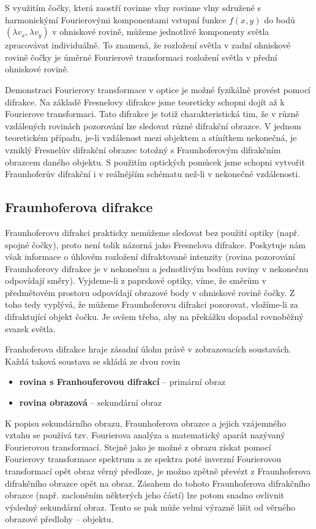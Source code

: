 \documentclass[11pt,a4paper]{article}
\begin{document}
S využitím čočky, která zaostří rovinne vlny rovinne vlny sdružené s harmonickýmí Fourierovými komponentami
vstupní funkce $f(x,y)$ do bodů $(\lambda v_x, \lambda v_y)$ v ohniskové rovině, můžeme jednotlivé
komponenty světla zpracovávat individuálně. To znamená, že rozložení světla v zadní ohniskové 
rovině čočky je úměrné Fourierově transformaci rozložení světla v přední ohniskové rovině.

Demonstraci Fourierovy transformace v optice je možné fyzikálně provést pomocí difrakce. Na základě
Fresnelovy difrakce jsme teoreticky schopni dojít až k Fourierove transformaci. Tato difrakce je totiž
charakteristická tim, že v různě vzdálených rovinách pozorování lze sledovat různé difrakční obrazce. V jednom
teoretickém případu, je-li vzdálenost mezi objektem a stínítkem nekonečná, je vzniklý Fresnelův difrakční 
obrazec totožný s Fraunhoferovým difrakčním obrazcem daného objektu. S použitím optických pomůcek
jsme schopni vytvořit Fraunhoferův difrakční i v reálnějším schématu než-li v nekonečné vzdálenosti.

\subsection{Fraunhoferova difrakce}
Fraunhoferovu difrakci prakticky nemůžeme sledovat bez použití optiky (např. spojné čočky), proto není tolik
názorná jako Fresnelova difrakce. Poskytuje nám však informace o úhlovém rozložení difraktované intenzity 
(rovina pozorování Fraunhoferovy difrakce je v nekonečnu a jednotlivým bodům roviny v nekonečnu odpovídají směry). 
Vyjdeme-li z paprskové optiky, víme, že směrům v předmětovém prostoru odpovídají obrazové 
body v ohniskové rovině čočky. Z toho tedy vyplývá, že můžeme Fraunhoferovu difrakci pozorovat, 
vložíme-li za difraktující objekt čočku. Je ovšem třeba, aby na překážku dopadal rovnoběžný svazek světla.

Franhoferova difrakce hraje zásadní úlohu právě v zobrazovacích soustavách. Každá taková soustava
se skládá ze dvou rovin

\begin{itemize}
\item \textbf{rovina s Franhouferovou difrakcí} -- primární obraz
\item \textbf{rovina obrazová} -- sekundární obraz
\end{itemize} 


K popisu sekundárního obrazu, Fraunhoferova obrazce a jejich vzájemného vztahu se používá tzv. 
Fourierova analýza a matematický aparát nazývaný Fourierovou transformací. 
Stejně jako je možné z obrazu získat pomocí Fourierovy transformace spektrum a ze spektra poté
inverzní Fourierovou transformací opět obraz věrný předloze, je možno zpětně převézt z Fraunhoferova 
difrakčního obrazce opět na obraz.
Zásahem do tohoto Fraunhoferova difrakčního obrazce (např. zacloněním 
některých jeho částí) lze potom snadno ovlivnit výsledný sekundární obraz. Tento se pak může 
velmi výrazně lišit od věrného obrazové předlohy -- objektu. 
\end{document}

